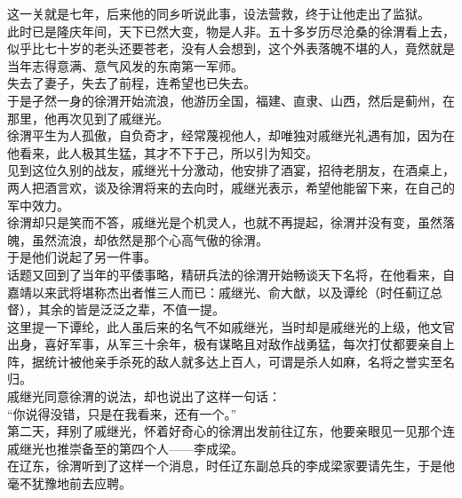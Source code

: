 \begin{multicols}{\theparacolNo}
这一关就是七年，后来他的同乡听说此事，设法营救，终于让他走出了监狱。\\

此时已是隆庆年间，天下已然大变，物是人非。五十多岁历尽沧桑的徐渭看上去，似乎比七十岁的老头还要苍老，没有人会想到，这个外表落魄不堪的人，竟然就是当年志得意满、意气风发的东南第一军师。\\

失去了妻子，失去了前程，连希望也已失去。\\

于是孑然一身的徐渭开始流浪，他游历全国，福建、直隶、山西，然后是蓟州，在那里，他再次见到了戚继光。\\

徐渭平生为人孤傲，自负奇才，经常蔑视他人，却唯独对戚继光礼遇有加，因为在他看来，此人极其生猛，其才不下于己，所以引为知交。\\

见到这位久别的战友，戚继光十分激动，他安排了酒宴，招待老朋友，在酒桌上，两人把酒言欢，谈及徐渭将来的去向时，戚继光表示，希望他能留下来，在自己的军中效力。\\

徐渭却只是笑而不答，戚继光是个机灵人，也就不再提起，徐渭并没有变，虽然落魄，虽然流浪，却依然是那个心高气傲的徐渭。\\

于是他们说起了另一件事。\\

话题又回到了当年的平倭事略，精研兵法的徐渭开始畅谈天下名将，在他看来，自嘉靖以来武将堪称杰出者惟三人而已：戚继光、俞大猷，以及谭纶（时任蓟辽总督），其余的皆是泛泛之辈，不值一提。\\

这里提一下谭纶，此人虽后来的名气不如戚继光，当时却是戚继光的上级，他文官出身，喜好军事，从军三十余年，极有谋略且对敌作战勇猛，每次打仗都要亲自上阵，据统计被他亲手杀死的敌人就多达上百人，可谓是杀人如麻，名将之誉实至名归。\\

戚继光同意徐渭的说法，却也说出了这样一句话：\\

“你说得没错，只是在我看来，还有一个。”\\

第二天，拜别了戚继光，怀着好奇心的徐渭出发前往辽东，他要亲眼见一见那个连戚继光也推崇备至的第四个人——李成梁。\\

在辽东，徐渭听到了这样一个消息，时任辽东副总兵的李成梁家要请先生，于是他毫不犹豫地前去应聘。\\


\end{multicols}
